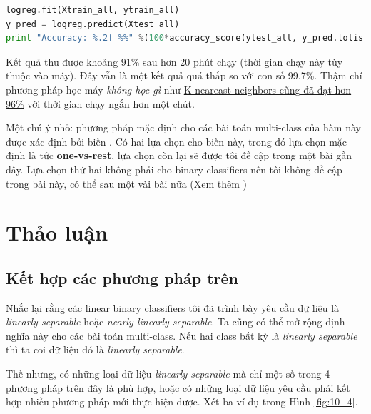 \begin{lstlisting}[language=Python]
logreg.fit(Xtrain_all, ytrain_all) 
y_pred = logreg.predict(Xtest_all) 
print "Accuracy: %.2f %%" %(100*accuracy_score(ytest_all, y_pred.tolist())) 
\end{lstlisting}
 
Kết quả thu được khoảng 91\% sau hơn 20 phút chạy (thời gian chạy này tùy thuộc vào máy). Đây vẫn là một kết quả quá thấp so với con số 99.7\%. Thậm chí phương pháp học máy \textit{không học gì} như \href{http://machinelearningcoban.com/2017/01/08/knn/#try-this-yourself}{K-neareast neighbors cũng đã đạt hơn 96\%} với thời gian chạy ngắn hơn một chút.  
 
Một chú ý nhỏ: phương pháp mặc định cho các bài toán multi-class của hàm này được xác định bởi biến . Có hai lựa chọn cho biến này, trong đó lựa chọn mặc định là  tức \textbf{one-vs-rest}, lựa chọn còn lại sẽ được tôi đề cập trong một bài gần đây. Lựa chọn thứ hai không phải cho binary classifiers nên tôi không đề cập trong bài này, có thể sau một vài bài nữa (Xem thêm \href{http://scikit-learn.org/stable/modules/generated/sklearn.linear_model.LogisticRegression.html}{}) 
 
 
 
\section{Thảo luận }
 
\subsection{Kết hợp các phương pháp trên}
 
Nhắc lại rằng các linear binary classifiers tôi đã trình bày yêu cầu dữ liệu là \textit{linearly separable} hoặc \textit{nearly linearly separable}. Ta cũng có thể mở rộng định nghĩa này cho các bài toán multi-class. Nếu hai class bất kỳ là \textit{linearly separable} thì ta coi dữ liệu đó là \textit{linearly separable}.  
 
Thế nhưng, có những loại dữ liệu \textit{linearly separable} mà chỉ một số trong 4 phương pháp trên đây là phù hợp, hoặc có những loại dữ liệu yêu cầu phải kết hợp nhiều phương pháp mới thực hiện được. Xét ba ví dụ trong Hình \eqref{fig:10_4}.
 
